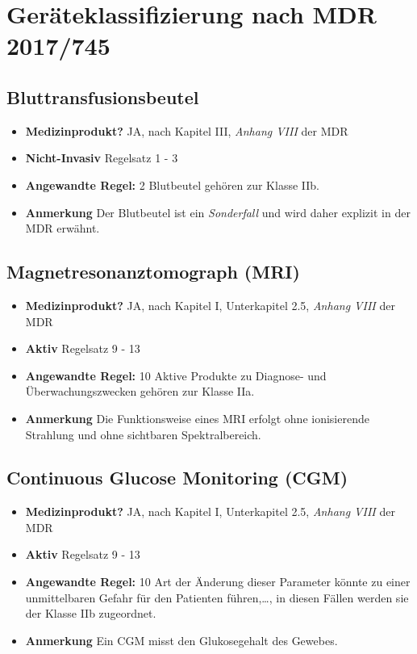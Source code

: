 \documentclass[fontsize=11pt,a4paper] {article}
\begin{document}
  \section{Geräteklassifizierung nach MDR 2017/745}
  \subsection{Bluttransfusionsbeutel}
\begin{itemize}
	\item \textbf{Medizinprodukt?}
	\subitem JA, nach Kapitel III, \textit{Anhang VIII} der MDR
	\item \textbf{Nicht-Invasiv} 
	\subitem Regelsatz 1 - 3
	\item \textbf{Angewandte Regel:} 2
	\subitem Blutbeutel gehören zur Klasse IIb.
\item \textbf{Anmerkung}
\subitem Der Blutbeutel ist ein \textit{Sonderfall} und wird daher explizit in der MDR erwähnt.
\end{itemize}
\subsection{Magnetresonanztomograph (MRI)}
\begin{itemize}
\item \textbf{Medizinprodukt?}
\subitem JA, nach Kapitel I, Unterkapitel 2.5, \textit{Anhang VIII} der MDR
\item \textbf{Aktiv} 
\subitem Regelsatz 9 - 13
\item \textbf{Angewandte Regel:} 10
\subitem Aktive Produkte zu Diagnose- und Überwachungszwecken gehören zur Klasse IIa.
\item \textbf{Anmerkung}
\subitem Die Funktionsweise eines MRI erfolgt ohne ionisierende Strahlung und ohne sichtbaren Spektralbereich.
\end{itemize}
\subsection{Continuous Glucose Monitoring (CGM)}
\begin{itemize}
	\item \textbf{Medizinprodukt?}
	\subitem JA, nach Kapitel I, Unterkapitel 2.5, \textit{Anhang VIII} der MDR
	\item \textbf{Aktiv} 
	\subitem Regelsatz 9 - 13
	\item \textbf{Angewandte Regel:} 10
	\subitem Art der Änderung dieser Parameter könnte zu einer unmittelbaren Gefahr für den Patienten führen,\dots, in diesen Fällen werden sie der Klasse IIb zugeordnet.
	\item \textbf{Anmerkung}
	\subitem Ein CGM misst den Glukosegehalt des Gewebes.
\end{itemize}
\end{document}
